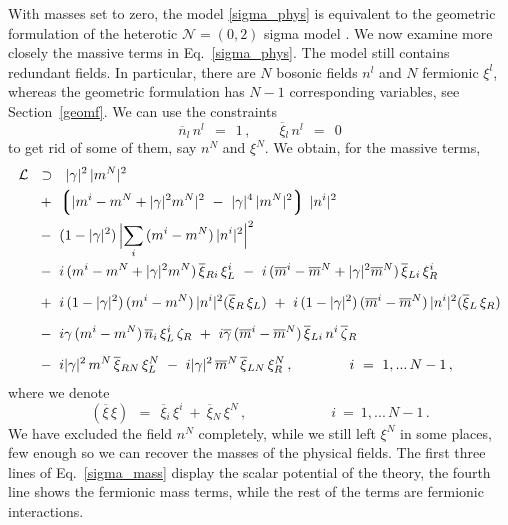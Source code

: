 \documentclass[12pt]{article}
\newcommand{\ntwoo}{${\mathcal N}= \left(0,2\right) $ }
\newcommand{\ov}{\overline}
\newcommand{\mc}[1]{\mathcal{#1}}
\newcommand{\lgr}{\left\lgroup}
\newcommand{\rgr}{\right\rgroup}
\newcommand{\bxir}{\ov{\xi}{}_R}
\newcommand{\bxil}{\ov{\xi}{}_L}
\newcommand{\xir}{\xi_R}
\newcommand{\xil}{\xi_L}
\newcommand{\bzr}{\ov{\zeta}{}_R}
\newcommand{\zr}{\zeta_R}
\begin{document}
	With masses set to zero, the model \eqref{sigma_phys} is equivalent to the 
	geometric formulation of the heterotic \ntwoo sigma model \cite{SYhet,BSYhet}.
	We now examine more closely the massive terms in Eq.~\eqref{sigma_phys}.
	The model still contains redundant fields.
	In particular, there are $N$ bosonic fields $n^l$ and $N$ fermionic $\xi^l$,
	whereas the geometric formulation has $N-1$ corresponding variables, see
	Section~\ref{geomf}.
	We can use the constraints
\[
	\ov{n}{}_l\, n^l ~~=~~ 1\,, \qquad \ov{\xi}{}_l\, n^l ~~=~~ 0
\]
	to get rid of some of them, say $ n^N $ and $ \xi^N $.
	We obtain, for the massive terms,
\begin{align}
%
\notag
	\mc{L} & ~~\supset~~ 
	|\gamma|^2\, |m^N|^2  
	\\
%
\notag
	&~
	~+~
	\lgr | m^i - m^N + |\gamma|^2 m^N |^2 ~-~ |\gamma|^4\, |m^N|^2 \rgr\, |n^i|^2 
	\\
%
\notag
	&~
	~-~ (1 - |\gamma|^2)\, \Bigl|\sum_i\, (m^i - m^N)\,|n^i|^2 \Bigr|^2
	\\
%	
\label{sigma_mass}
	&~
	~-~ i\,(m^i - m^N + |\gamma|^2 m^N )\,\ov{\xi}{}_{Ri}\,\xi_L^i
	~-~ i\,(\ov{m}{}^i - \ov{m}{}^N + |\gamma|^2\ov{m}{}^N)\, \ov{\xi}{}_{Li}\, \xi_R^i 
	\\[2mm]
%
\notag
	&~
	~+~ i\,(1-|\gamma|^2)\,(m^i - m^N)\,|n^i|^2(\bxir\,\xil) 
	~+~ i\,(1-|\gamma|^2)\,(\ov{m}{}^i - \ov{m}{}^N)\,|n^i|^2(\bxil\,\xir)
	\\[2mm]
%
\notag
	&~
	~-~ i \gamma\, (m^i - m^N)\, \ov{n}{}_i\, \xi_L^i\, \zr
	~+~ i \ov{\gamma}\, (\ov{m}{}^i - \ov{m}{}^N)\, \ov{\xi}{}_{Li}\, n^i\, \bzr
	\\[2mm]
%
\notag
	&~
	~-~ i |\gamma|^2\, m^N\, \ov{\xi}{}_{RN}\, \xi_L^N
	~-~ i |\gamma|^2\, \ov{m}^N\, \ov{\xi}{}_{LN}\, \xi_R^N\,,
	\qquad\qquad
	i ~=~ 1,...\,N-1\,,
\end{align}
	where we denote
\[
	(\ov{\xi}\, \xi) ~~=~~ \ov{\xi}{}_i\, \xi^i  ~+~  \ov{\xi}{}_N\, \xi^N\,,
	\qquad\qquad\qquad
	i ~=~ 1,...\,N-1\,.
\]
	We have excluded the field $ n^N $ completely, while we still left $ \xi^N $ in some places,
	few enough so we can recover the masses of the physical fields. 
	The first three lines of Eq.~\eqref{sigma_mass} display the scalar potential of the theory,
	the fourth line shows the fermionic mass terms, while the rest of the terms are 
	fermionic interactions.
\end{document}
